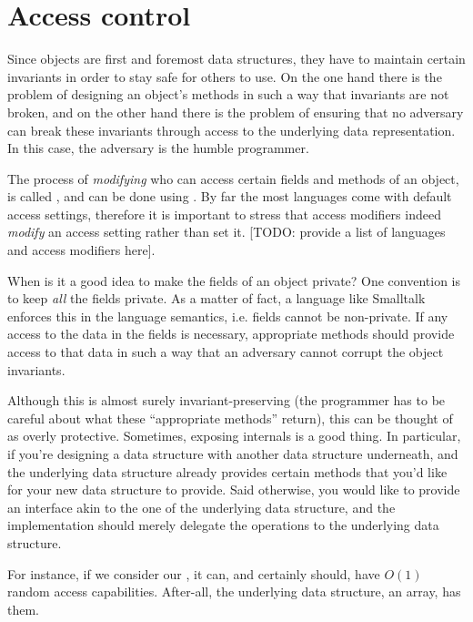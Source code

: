 \section{Access control}\label{section:objects:encapsulation}


Since objects are first and foremost data structures, they have to maintain
certain invariants in order to stay safe for others to use. On the one hand
there is the problem of designing an object's methods in such a way that
invariants are not broken, and on the other hand there is the problem of
ensuring that no adversary can break these invariants through access to the
underlying data representation. In this case, the adversary is the humble
programmer.

The process of \emph{modifying} who can access certain fields and methods of an
object, is called , and can be done using . By far the most languages come with default access settings,
therefore it is important to stress that access modifiers indeed \emph{modify}
an access setting rather than set it. [TODO: provide a list of languages and
access modifiers here].

When is it a good idea to make the fields of an object private? One convention
is to keep \emph{all} the fields private. As a matter of fact, a language like
Smalltalk enforces this in the language semantics, i.e. fields cannot be
non-private. If any access to the data in the fields is necessary, appropriate
methods should provide access to that data in such a way that an adversary
cannot corrupt the object invariants.

Although this is almost surely invariant-preserving (the programmer has to be
careful about what these ``appropriate methods'' return), this can be thought
of as overly protective. Sometimes, exposing internals is a good thing. In
particular, if you're designing a data structure with another data structure
underneath, and the underlying data structure already provides certain methods
that you'd like for your new data structure to provide. Said otherwise, you
would like to provide an interface akin to the one of the underlying data
structure, and the implementation should merely delegate the operations to the
underlying data structure.

For instance, if we consider our , it can, and certainly
should, have $O(1)$ random access capabilities. After-all, the underlying data
structure, an array, has them.

